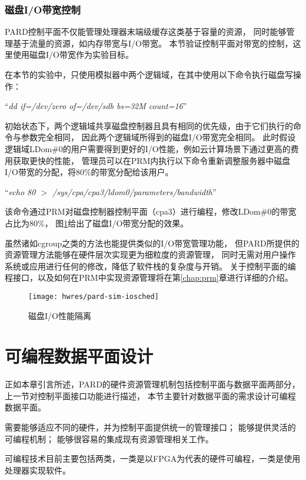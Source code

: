 \subsubsection{磁盘I/O带宽控制}

PARD控制平面不仅能管理处理器末端级缓存这类基于容量的资源，
同时能够管理基于流量的资源，如内存带宽与I/O带宽。
本节验证控制平面对带宽的控制，这里使用磁盘I/O带宽作为实验目标。

在本节的实验中，只使用模拟器中两个逻辑域，在其中使用以下命令执行磁盘写操作：

``\emph{dd if=/dev/zero of=/dev/sdb bs=32M count=16}''

初始状态下，两个逻辑域共享磁盘控制器且具有相同的优先级，由于它们执行的命令与参数完全相同，
因此两个逻辑域所得到的磁盘I/O带宽完全相同。
此时假设逻辑域LDom\#0的用户需要得到更好的I/O性能，例如云计算场景下通过更高的费用获取更快的性能，
管理员可以在PRM内执行以下命令重新调整服务器中磁盘I/O带宽的分配，将80\%的带宽分配给该用户。

``\emph{echo 80 $>$ /sys/cpa/cpa3/ldom0/parameters/bandwidth}''

该命令通过PRM对磁盘控制器控制平面（cpa3）进行编程，修改LDom\#0的带宽占比为80\%，
图\ref{fig:pardsim:iosched}给出了磁盘I/O带宽分配的效果。

虽然诸如cgroup\cite{cgroup}之类的方法也能提供类似的I/O带宽管理功能，
但PARD所提供的资源管理方法能够在硬件层次实现更为细粒度的资源管理，
同时无需对用户操作系统或应用进行任何的修改，降低了软件栈的复杂度与开销。
关于控制平面的编程接口，以及如何在PRM中实现资源管理将在第\ref{chap:prm}章进行详细的介绍。

\begin{figure}[tb]
  \centering
  \texttt{[image: hwres/pard-sim-iosched]}
  \caption{磁盘I/O性能隔离}
  \label{fig:pardsim:iosched}
\end{figure}


\section{可编程数据平面设计}
\label{chap:hwresman:dp}

正如本章引言所述，PARD的硬件资源管理机制包括控制平面与数据平面两部分，上一节对控制平面接口功能进行描述，
本节主要针对数据平面的需求设计可编程数据平面。

需要能够适应不同的硬件，并为控制平面提供统一的管理接口；
能够提供灵活的可编程机制；
能够很容易的集成现有资源管理相关工作。

可编程技术目前主要包括两类，一类是以FPGA为代表的硬件可编程，一类是使用处理器实现软件。

